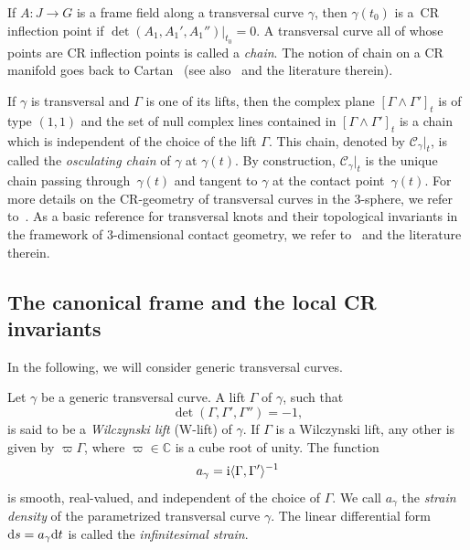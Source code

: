 \documentclass[pdftex]{sigma}
\numberwithin{equation}{section}
\def\C{\mathbb{C}}
\begin{document}
\begin{Remark}
If $A \colon J \to G$ is a frame field along a transversal curve $\gamma$, then $\gamma({t_0})$ is a~CR inflection point
if $ \det(A_1,A_1',A_1'')\big|_{t_0} = 0$. A transversal curve all of whose points are CR inflection points is
called a \textit{chain}. The notion of chain on a CR manifold goes back to Cartan~\cite{Cartan1932-2, Cartan1932}
(see also~\cite{Jacobo1985} and the literature therein).

 If $\gamma$ is transversal and $\Gamma$ is one of its lifts, then the complex plane $[\Gamma\wedge\Gamma']_{ t}$
 is of type $(1,1)$ and the set of null complex lines contained in $[\Gamma\wedge\Gamma']_{ t}$ is a chain
 which is independent of the choice of the lift $\Gamma$. This chain, denoted by $\mathcal{C}_{ \gamma} |_t$, is
 called the \emph{osculating chain} of $\gamma$ at $\gamma(t)$. By construction, $\mathcal{C}_{ \gamma} |_t$
 is the unique chain passing through~$\gamma(t)$ and tangent to $\gamma$ at the contact point~$\gamma(t)$.
For more details on the {CR}-geometry of transversal curves in the 3-sphere, we refer to~\cite{MNS-Kharkiv}.
{As a basic reference for transversal knots and their topological invariants in the framework of 3-dimensional
contact geometry, we refer to~\cite{Et2} and the literature therein}.
\end{Remark}


\subsection{The canonical frame and the local CR invariants}\label{ss:canonical-frame}

In the following, we will consider generic transversal curves.

\begin{Definition}
Let $\gamma$ be a generic transversal curve. A lift $\Gamma$ of $\gamma$, such that
\[
 \det(\Gamma,\Gamma',\Gamma'')= -1,
\]
is said to be a \emph{Wilczynski lift} (W-lift) of $\gamma$.
%
 If $\Gamma$ is a Wilczynski lift, any other is given by $\varpi\Gamma$, where $\varpi\in\C$
 is a cube root of unity.
 The function
\[
 a_\gamma = {\rm i}\langle\Gamma,\Gamma'\rangle^{-1}
\]
is smooth, real-valued, and independent of the choice of $\Gamma$.
%
We call $a_\gamma$ the \emph{strain density} of the parametrized transversal curve $\gamma$.
The linear differential form ${\rm d}s = a_\gamma {\rm d}t$ is called the \emph{infinitesimal strain}.
\end{Definition}
\end{document}
